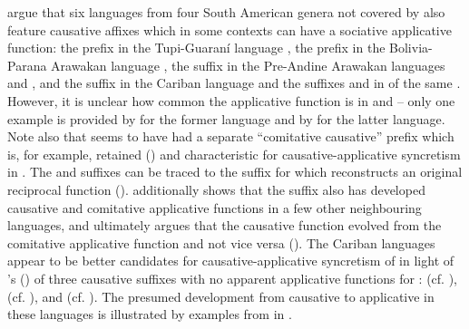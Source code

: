 \cite[391]{guillaume:rose:2010} argue that six languages from four South American genera not covered by \cite{shibatani:pardeshi:2002} also feature causative affixes which in some contexts can have a sociative applicative function: the prefix  in the Tupi-Guaraní language , the prefix  in the Bolivia-Parana Arawakan language , the suffix  in the Pre-Andine Arawakan languages  and , and the suffix  in the Cariban language  and the suffixes  and  in  of the same . However, it is unclear how common the applicative function is in  and  -- only one example is provided by \cite[522]{velazquez-castillo:2002} for the former language and by \cite[98]{wise:1990} for the latter language. Note also that  seems to have had a separate “comitative causative” prefix  \citep[593]{jensen:1998} which is, for example, retained () and characteristic for causative-applicative syncretism in  \citep{rose:2003}. The  and  suffixes can be traced to the  suffix  for which \cite[109]{wise:1990} reconstructs an original reciprocal function (). \cite[104, 110]{wise:1990} additionally shows that the suffix also has developed causative and comitative applicative functions in a few other neighbouring languages, and ultimately argues that the causative function evolved from the comitative applicative function and not vice versa (). The Cariban languages appear to be better candidates for causative-applicative syncretism of  in light of \citeauthor{gildea:2015}’s (\citeyear[6ff.]{gildea:2015})  of three causative suffixes with no apparent applicative functions for :  (cf.  ),  (cf.  ), and  (cf.  ). The presumed development from causative to applicative in these languages is illustrated by examples from  in  \citep[41, 125f.]{abbott:1991}. 

